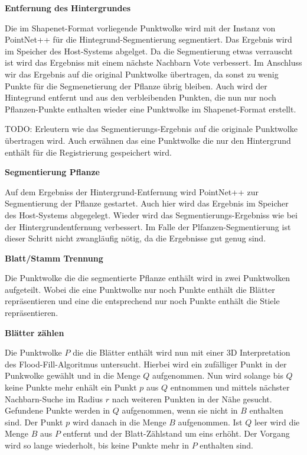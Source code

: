 \documentclass[12pt,titlepage, twoside]{article}
\begin{document}
\textbf{Entfernung des Hintergrundes}

Die im Shapenet-Format vorliegende Punktwolke wird mit der Instanz von PointNet++ für die Hintegrund-Segmentierung segmentiert. Das Ergebnis wird im Speicher des Host-Systems abgelget.
Da die Segmentierung etwas verrauscht ist wird das Ergebniss mit einem nächste Nachbarn Vote verbessert.
Im Anschluss wir das Ergebnis auf die original Punktwolke übertragen, da sonst zu wenig Punkte für die Segmenetierung der Pflanze übrig bleiben.
Auch wird der Hintegrund entfernt und aus den verbleibenden Punkten, die nun nur noch Pflanzen-Punkte enthalten wieder eine Punktwolke im Shapenet-Format erstellt.

TODO: Erleutern wie das Segmentierungs-Ergebnis auf die originale Punktwolke übertragen wird. Auch erwähnen das eine Punktwolke die nur den Hintergrund enthält für die Registrierung gespeichert wird.

\textbf{Segmentierung Pflanze}

Auf dem Ergebniss der Hintergrund-Entfernung wird PointNet++ zur Segmentierung der Pflanze gestartet. Auch hier wird das Ergebnis im Speicher des Host-Systems abgegelegt. 
Wieder wird das Segmentierungs-Ergebniss wie bei der Hintergrundentfernung verbessert. Im Falle der Plfanzen-Segmentierung ist dieser Schritt nicht zwangläufig nötig, da die Ergebnisse gut genug sind.

\textbf{Blatt/Stamm Trennung}

Die Punktwolke die die segmentierte Pflanze enthält wird in zwei Punktwolken aufgeteilt. 
Wobei die eine Punktwolke nur noch Punkte enthält die Blätter repräsentieren und eine die entsprechend nur noch Punkte enthält die Stiele repräsentieren.

\textbf{Blätter zählen}

Die Punktwolke $P$ die die Blätter enthält wird nun mit einer 3D Interpretation des Flood-Fill-Algoritmus untersucht. Hierbei wird ein zufälliger Punkt in der Punkwolke gewählt und in die Menge $Q$ aufgenommen.
Nun wird solange bis $Q$ keine Punkte mehr enhält ein Punkt $p$ aus $Q$ entnommen und mittels nächster Nachbarn-Suche im Radius $r$ nach weiteren Punkten in der Nähe gesucht. Gefundene Punkte werden in $Q$ aufgenommen, wenn sie nicht in $B$ enthalten sind.
Der Punkt $p$ wird danach in die Menge $B$ aufgenommen. Ist $Q$ leer wird die Menge $B$ aus $P$ entfernt und der Blatt-Zählstand um eins erhöht. 
Der Vorgang wird so lange wiederholt, bis keine Punkte mehr in $P$ enthalten sind.
\end{document}
